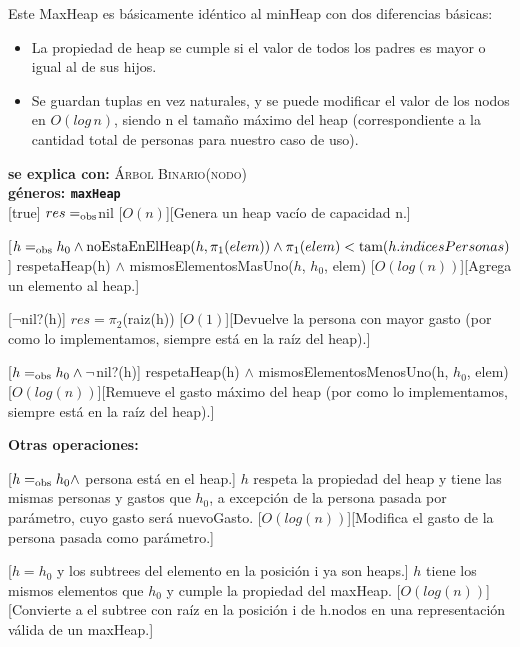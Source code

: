 \documentclass[../main.tex]{subfiles}
\begin{document}
Este MaxHeap es básicamente idéntico al minHeap con dos diferencias básicas:
\begin{itemize}
    \item La propiedad de heap se cumple si el valor de todos los padres es mayor o igual al de sus hijos.
    \item Se guardan tuplas en vez naturales, y se puede modificar el valor de los nodos en $O(log\, n)$, siendo n el tamaño máximo del heap (correspondiente a la cantidad total de personas para nuestro caso de uso).
\end{itemize}

\begin{interfaz}

\textbf{se explica con: }\textsc{Árbol Binario(nodo)} \\
\textbf{géneros: \texttt{maxHeap}} \\

[true]
{$res =_{\mathrm{obs}} $nil}
[$O(n)$][Genera un heap vacío de capacidad n.]   

[$h =_{\mathrm{obs}} h_0 \land \text{noEstaEnElHeap}(h, \pi_1(elem)) \land \pi_1(elem) < \text{tam}(h.indicesPersonas)$]
{respetaHeap(h) $\land$ mismosElementosMasUno($h$, $h_0$, elem)}
[$O(log(n))$][Agrega un elemento al heap.] 

[$\neg$nil?(h)]
{$res = \pi_2$(raiz(h))}
[$O(1)$][Devuelve la persona con mayor gasto (por como lo implementamos, siempre está en la raíz del heap).]

[$h =_{\mathrm{obs}} h_0 \land \neg$nil?(h)]
{respetaHeap(h) $\land$ mismosElementosMenosUno(h, $h_0$, elem)}
[$O(log(n))$][Remueve el gasto máximo del heap (por como lo implementamos, siempre está en la raíz del heap).]

{\large\bfseries Otras operaciones: }

[$h =_{\mathrm{obs}} h_0 \land$ persona está en el heap.]
{$h$ respeta la propiedad del heap y tiene las mismas personas y gastos que $h_0$, a excepción de la persona
pasada por parámetro, cuyo gasto será nuevoGasto.}
[$O(log(n))$][Modifica el gasto de la persona pasada como parámetro.]

[$h = h_0$ y los subtrees del elemento en la posición i ya son heaps.]
{$h$ tiene los mismos elementos que $h_0$ y cumple la propiedad del maxHeap.}
[$O(log(n))$][Convierte a el subtree con raíz en la posición i de h.nodos en una representación válida de un maxHeap.]


\end{interfaz}
\end{document}
